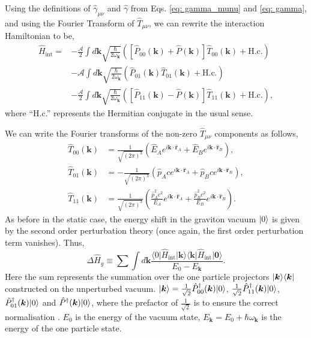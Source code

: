 \documentclass[12pt,a4paper]{report}
\theoremstyle{plain}
\theoremstyle{definition}
\theoremstyle{remark}
\newcommand{\munu}{\mu\nu}
\DeclarePairedDelimiter\bra{\langle}{\rvert}
\DeclarePairedDelimiter\ket{\lvert}{\rangle}
\begin{document}
Using the definitions of $\hat{\gamma}_{\munu}$ and $\hat{\gamma}$ from Eqs. \ref{eq: gamma_munu} and \ref{eq: gamma}, and using the Fourier Transform of $\hat{T}_{\munu}$, we can rewrite the interaction Hamiltonian to be,
\begin{equation} \label{eq:HintNonStatK}
    \begin{aligned}
        \hat{H}_{\text{int}}= & -\frac{\mathcal{A}}{2}\int d\bm{k}\sqrt{\frac{\hbar}{2\omega_{\bm{k}}}}(\left[\hat{P}_{00}(\bm{k})+\hat{P}(\bm{k})\right]\hat{T}_{00}(\bm{k})+\text{H.c.}) \\
 & -\mathcal{A}\int d\bm{k}\sqrt{\frac{\hbar}{2\omega_{\bm{k}}}}(\hat{P}_{01}(\bm{k})\hat{T}_{01}(\bm{k})+\text{H.c.}) \\
 & -\frac{\mathcal{A}}{2}\int d\bm{k}\sqrt{\frac{\hbar}{2\omega_{\bm{k}}}}(\left[\hat{P}_{11}(\bm{k})-\hat{P}(\bm{k})\right]\hat{T}_{11}(\bm{k})+\text{H.c.}),
    \end{aligned}
\end{equation}
where ``H.c.'' represents the Hermitian conjugate in the usual sense.

We can write the Fourier transforms of the non-zero $\hat{T}_{\munu}$ components as follows,
\begin{align}
    \hat{T}_{00}(\bm{k}) & =\frac{1}{\sqrt{(2\pi)^{3}}}(\hat{E}_{A}e^{i\bm{k}\cdot\hat{\bm{r}}_{A}}+\hat{E}_{B}e^{i\bm{k}\cdot\hat{\bm{r}}_{B}}),\label{eq:sources1}\\
\hat{T}_{01}(\bm{k}) & =-\frac{1}{\sqrt{(2\pi)^{3}}}(\hat{p}_{A}ce^{i\bm{k}\cdot\hat{\bm{r}}_{A}}+\hat{p}_{B}ce^{i\bm{k}\cdot\hat{\bm{r}}_{B}}),\\
\hat{T}_{11}(\bm{k}) & =\frac{1}{\sqrt{(2\pi)^{3}}}(\frac{\hat{p}_{A}^{2}c^{2}}{E_{A}}e^{i\bm{k}\cdot\hat{\bm{r}}_{A}}+\frac{\hat{p}_{B}^{2}c^{2}}{E_{B}}e^{i\bm{k}\cdot\hat{\bm{r}}_{B}}).
\end{align}
As before in the static case, the energy shift in the graviton vacuum $\ket{0}$ is given by the second order perturbation theory (once again, the first order perturbation term vanishes). Thus,
\begin{equation}\label{eq: HgNonStat}
    \Delta\hat{H}_{g}\equiv\sum\int d\bm{k}\frac{\langle0\vert\hat{H}_{\text{int}}\vert\bm{k}\rangle\langle\bm{k}\vert\hat{H}_{\text{int}}\vert\bm{0}\rangle}{E_{0}-E_{\bm{k}}}.
\end{equation}
Here the sum represents the summation over the one particle projectors $\ket{\bm{k}}\bra{\bm{k}}$ constructed on the unperturbed vacuum. $\ket{\bm{k}} = \frac{1}{\sqrt{2}}\hat{P}_{00}^{\dagger}(\bm{k})\ket{0}$, $\frac{1}{\sqrt{2}}\hat{P}_{11}^{\dagger}(\bm{k})\ket{0}$, $\hat{P}_{01}^{\dagger}(\bm{k})\ket{0}$ and $\hat{P}^{\dagger}(\bm{k})\ket{0}$, where the prefactor of $\frac{1}{\sqrt{2}}$ is to ensure the correct normalisation \cite{Bose_2022}. $E_0$ is the energy of the vacuum state, $E_{\bm{k}} = E_0 + \hbar\omega_{\bm{k}}$ is the energy of the one particle state.
\end{document}
